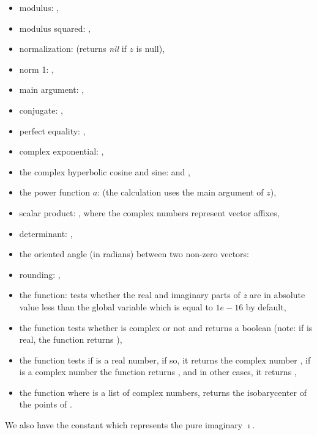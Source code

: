 \begin{itemize}
    \begin{itemize}
    \item modulus: ,
    \item modulus squared: ,
    \item normalization:  (returns \emph{nil} if $z$ is null),
    \item norm 1: ,
    \item main argument: ,
    \item conjugate: ,
    \item perfect equality: ,
    \item complex exponential: ,
    \item the complex hyperbolic cosine and sine:  and ,
    \item the power function $a$:  (the calculation uses the main argument of $z$),
    \item scalar product: , where the complex numbers represent vector affixes,
    \item determinant: ,
    \item the oriented angle (in radians) between two non-zero vectors: 
    \item rounding: ,
    \item the function:  tests whether the real and imaginary parts of \emph{z} are in absolute value less than the global variable  which is equal to $1e-16$ by default,
    \item the function  tests whether  is complex or not and returns a boolean (note: if  is real, the function returns \false),
    \item the function  tests if  is a real number, if so, it returns the complex number , if  is a complex number the function returns , and in other cases, it returns \nil,
    \item the function  where  is a list of complex numbers, returns the isobarycenter of the points of .
    \end{itemize}
\end{itemize}

We also have the constant  which represents the pure imaginary $\imath$.

